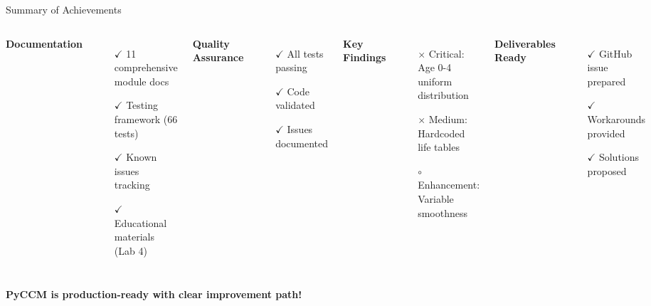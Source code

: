 \documentclass[aspectratio=169]{beamer}
\begin{document}
\begin{frame}{Summary of Achievements}
\begin{columns}
\textbf{Documentation}
\begin{itemize}
    \item[\textcolor{successgreen}{$\checkmark$}] 11 comprehensive module docs
    \item[\textcolor{successgreen}{$\checkmark$}] Testing framework (66 tests)
    \item[\textcolor{successgreen}{$\checkmark$}] Known issues tracking
    \item[\textcolor{successgreen}{$\checkmark$}] Educational materials (Lab 4)
\end{itemize}

\vspace{0.3cm}

\textbf{Quality Assurance}
\begin{itemize}
    \item[\textcolor{successgreen}{$\checkmark$}] All tests passing
    \item[\textcolor{successgreen}{$\checkmark$}] Code validated
    \item[\textcolor{successgreen}{$\checkmark$}] Issues documented
\end{itemize}

\textbf{Key Findings}
\begin{itemize}
    \item[\textcolor{criticalred}{$\times$}] Critical: Age 0-4 uniform distribution
    \item[\textcolor{warningorange}{$\times$}] Medium: Hardcoded life tables
    \item[\textcolor{codeblue}{$\circ$}] Enhancement: Variable smoothness
\end{itemize}

\vspace{0.3cm}

\textbf{Deliverables Ready}
\begin{itemize}
    \item[\textcolor{successgreen}{$\checkmark$}] GitHub issue prepared
    \item[\textcolor{successgreen}{$\checkmark$}] Workarounds provided
    \item[\textcolor{successgreen}{$\checkmark$}] Solutions proposed
\end{itemize}
\end{columns}

\vspace{0.5cm}

\begin{center}
\Large
\textbf{PyCCM is production-ready with clear improvement path!}
\end{center}
\end{frame}
\end{document}
